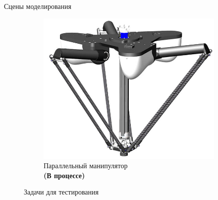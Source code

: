 \documentclass[11pt, aspectratio=169]{beamer}
\begin{document}
\begin{frame}{Сцены моделирования}
\begin{figure}[ht]
\begin{subfigure}{0.32\textwidth}
            \label{fig:lbr_cup}
        \end{subfigure}
        \begin{subfigure}{0.32\textwidth}
            \centering
            \includegraphics[width=1.0\textwidth]{figures/delta.png}
            \caption{\centering Параллельный манипулятор\\ \textbf{(В процессе)}}
            \label{fig:parallel}
        \end{subfigure}
        \label{fig:tasks}
        \caption{Задачи для тестирования}
    \end{figure}
\end{frame}
\end{document}
